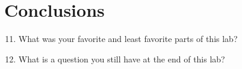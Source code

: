 \documentclass[12pt]{article}
\begin{document}
\section{Conclusions}
\noindent
\begin{enumerate}
\setcounter{enumi}{10}
\item What was your favorite and least favorite parts of this lab?

\item What is a question you still have at the end of this lab?

\end{enumerate}
\end{document}
